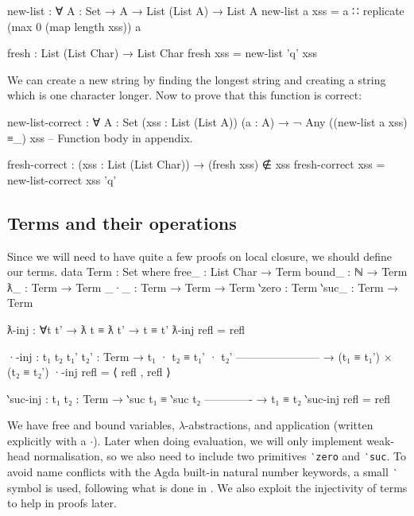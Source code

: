 \documentclass[logo,bsc,singlespacing,parskip,online]{infthesis}
\renewenvironment{code}{\mintedcopy[breaklines,breaksymbolleft=\;]{agda}}{\endmintedcopy}
\begin{document}
\begin{code}
new-list : ∀ {A : Set} → A → List (List A) → List A
new-list a xss = a ∷ replicate (max 0 (map length xss)) a

fresh : List (List Char) → List Char
fresh xss = new-list 'q' xss
\end{code}

We can create a new string by finding the longest string and creating a string which is one
character longer. Now to prove that this function is correct:

\begin{code}

new-list-correct : ∀ {A : Set} (xss : List (List A)) (a : A)
  → ¬ Any ((new-list a xss) ≡_) xss
-- Function body in appendix.

fresh-correct : (xss : List (List Char)) → (fresh xss) ∉ xss
fresh-correct xss = new-list-correct xss 'q'
\end{code}

\subsection{Terms and their operations}

Since we will need to have quite a few proofs on local closure, we should define our terms.
\begin{code}
data Term : Set where
  free_  : List Char → Term
  bound_ : ℕ → Term
  ƛ_     : Term → Term
  _·_    : Term → Term → Term
  ‵zero  : Term
  ‵suc_  : Term → Term

ƛ-inj : ∀{t t'} → ƛ t ≡ ƛ t' → t ≡ t'
ƛ-inj refl = refl

·-inj : {t₁ t₂ t₁' t₂' : Term}
  → t₁ · t₂ ≡ t₁' · t₂'
    -----------------------
  → (t₁ ≡ t₁') × (t₂ ≡ t₂')
·-inj refl = ⟨ refl , refl ⟩

‵suc-inj : {t₁ t₂ : Term}
  → ‵suc t₁ ≡ ‵suc t₂
    -------------
  → t₁ ≡ t₂
‵suc-inj refl = refl
\end{code}

We have free and bound variables, $\lambda$-abstractions, and application (written explicitly with a
$\cdot$). Later when doing evaluation, we will only implement weak-head normalisation, so we also
need to include two primitives \texttt{‵zero} and \texttt{‵suc}. To avoid name conflicts with the
Agda built-in natural number keywords, a small \texttt{‵} symbol is used, following what is done in
\citet{wadler_programming_2022}. We also exploit the injectivity of terms to help in proofs later.
\end{document}
